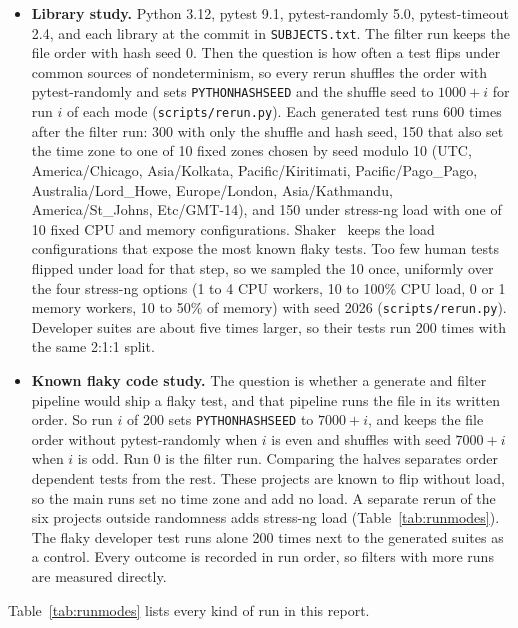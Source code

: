 \begin{itemize}
\item \textbf{Library study.} Python 3.12, pytest 9.1, pytest-randomly 5.0, pytest-timeout 2.4, and each library at the commit in \texttt{SUBJECTS.txt}. The filter run keeps the file order with hash seed 0. Then the question is how often a test flips under common sources of nondeterminism, so every rerun shuffles the order with pytest-randomly and sets \texttt{PYTHONHASHSEED} and the shuffle seed to $1000+i$ for run $i$ of each mode (\texttt{scripts/rerun.py}). Each generated test runs 600 times after the filter run: 300 with only the shuffle and hash seed, 150 that also set the time zone to one of 10 fixed zones chosen by seed modulo 10 (UTC, America/Chicago, Asia/Kolkata, Pacific/Kiritimati, Pacific/Pago\_Pago, Australia/Lord\_Howe, Europe/London, Asia/Kathmandu, America/St\_Johns, Etc/GMT-14), and 150 under stress-ng load with one of 10 fixed CPU and memory configurations. Shaker~\cite{silva2020} keeps the load configurations that expose the most known flaky tests. Too few human tests flipped under load for that step, so we sampled the 10 once, uniformly over the four stress-ng options (1 to 4 CPU workers, 10 to 100\% CPU load, 0 or 1 memory workers, 10 to 50\% of memory) with seed 2026 (\texttt{scripts/rerun.py}). Developer suites are about five times larger, so their tests run 200 times with the same 2:1:1 split.
\item \textbf{Known flaky code study.} The question is whether a generate and filter pipeline would ship a flaky test, and that pipeline runs the file in its written order. So run $i$ of 200 sets \texttt{PYTHONHASHSEED} to $7000+i$, and keeps the file order without pytest-randomly when $i$ is even and shuffles with seed $7000+i$ when $i$ is odd. Run 0 is the filter run. Comparing the halves separates order dependent tests from the rest. These projects are known to flip without load, so the main runs set no time zone and add no load. A separate rerun of the six projects outside randomness adds stress-ng load (Table~\ref{tab:runmodes}). The flaky developer test runs alone 200 times next to the generated suites as a control. Every outcome is recorded in run order, so filters with more runs are measured directly.
\end{itemize}
Table~\ref{tab:runmodes} lists every kind of run in this report.

